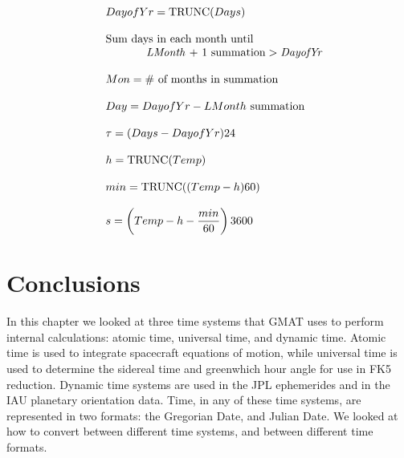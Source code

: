 %
\begin{equation}
     \begin{array}{llll}
      & DayofYr = \mbox{TRUNC}(Days) \\
      & \\
      & \mbox{Sum days in each month until}\\
      & \hspace{.5 in} \mbox{\emph{LMonth} + 1 summation} > \mbox{\emph{DayofYr}} \\
      & \\
      &  Mon = \# \mbox{ of months in summation} \\
      & \\
      &  Day = DayofYr - LMonth \mbox{ summation}\\
      & \\
      &  \tau = (Days - DayofYr)24\\
      &  \\
      &  h = \mbox{TRUNC}(Temp)\\
      &  \\
      &  min = \mbox{TRUNC}((Temp - h)60) \\
      &  \\
      &  s = \left( Temp - h - \displaystyle\frac{min}{60} \right)3600
       \end{array}\nonumber
\end{equation}

\section{Conclusions}

In this chapter we looked at three time systems that GMAT uses to
perform internal calculations:  atomic time, universal time, and
dynamic time.  Atomic time is used to integrate spacecraft
equations of motion, while universal time is used to determine the
sidereal time and greenwhich hour angle for use in FK5 reduction.
Dynamic time systems are used in the JPL ephemerides and in the
IAU planetary orientation data.   Time, in any of these time
systems, are represented in two formats:  the Gregorian Date, and
Julian Date. We looked at how to convert between different time
systems, and between different time formats.
